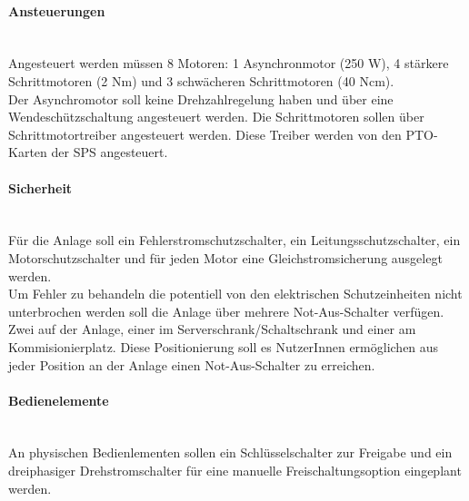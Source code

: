    \paragraph{Ansteuerungen}\mbox{}\\
    Angesteuert werden müssen 8 Motoren: 1 Asynchronmotor (250 W), 4 stärkere Schrittmotoren (2 Nm) und 3 schwächeren Schrittmotoren (40 Ncm). \\
    Der Asynchromotor soll keine Drehzahlregelung haben und über eine Wendeschützschaltung angesteuert werden. Die Schrittmotoren sollen über Schrittmotortreiber angesteuert werden. Diese Treiber werden von den PTO-Karten der SPS angesteuert.

    \paragraph{Sicherheit}\mbox{}\\
    Für die Anlage soll ein Fehlerstromschutzschalter, ein Leitungsschutzschalter, ein Motorschutzschalter und für jeden Motor eine Gleichstromsicherung ausgelegt werden.\\ 
    Um Fehler zu behandeln die potentiell von den elektrischen Schutzeinheiten nicht unterbrochen werden soll die Anlage über mehrere Not-Aus-Schalter verfügen. Zwei auf der Anlage, einer im Serverschrank/Schaltschrank und einer am Kommisionierplatz. Diese Positionierung soll es NutzerInnen ermöglichen aus jeder Position an der Anlage einen Not-Aus-Schalter zu erreichen.

    \paragraph{Bedienelemente}\mbox{}\\
    An physischen Bedienlementen sollen ein Schlüsselschalter zur Freigabe und ein dreiphasiger Drehstromschalter für eine manuelle Freischaltungsoption eingeplant werden.

